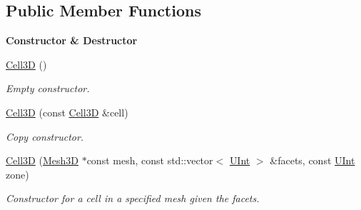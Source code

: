\subsection*{Public Member Functions}
\begin{Indent}{\bf Constructor \& Destructor}\par
\begin{DoxyCompactItemize}
\item 
\hyperlink{classFVCode3D_1_1Mesh3D_1_1Cell3D_a975daf83e16e8ee91f06e346a6fbb37d}{Cell3D} ()
\begin{DoxyCompactList}\small\item\em Empty constructor. \end{DoxyCompactList}\item 
\hyperlink{classFVCode3D_1_1Mesh3D_1_1Cell3D_aab1f2e91f0e2c6a4dc366b114802cbff}{Cell3D} (const \hyperlink{classFVCode3D_1_1Mesh3D_1_1Cell3D}{Cell3D} \&cell)
\begin{DoxyCompactList}\small\item\em Copy constructor. \end{DoxyCompactList}\item 
\hyperlink{classFVCode3D_1_1Mesh3D_1_1Cell3D_ac02c0684ef4259520ed1a312ce402bb5}{Cell3D} (\hyperlink{classFVCode3D_1_1Mesh3D}{Mesh3D} $\ast$const mesh, const std\+::vector$<$ \hyperlink{namespaceFVCode3D_a4bf7e328c75d0fd504050d040ebe9eda}{U\+Int} $>$ \&facets, const \hyperlink{namespaceFVCode3D_a4bf7e328c75d0fd504050d040ebe9eda}{U\+Int} zone)
\begin{DoxyCompactList}\small\item\em Constructor for a cell in a specified mesh given the facets. \end{DoxyCompactList}\end{DoxyCompactItemize}
\end{Indent}
